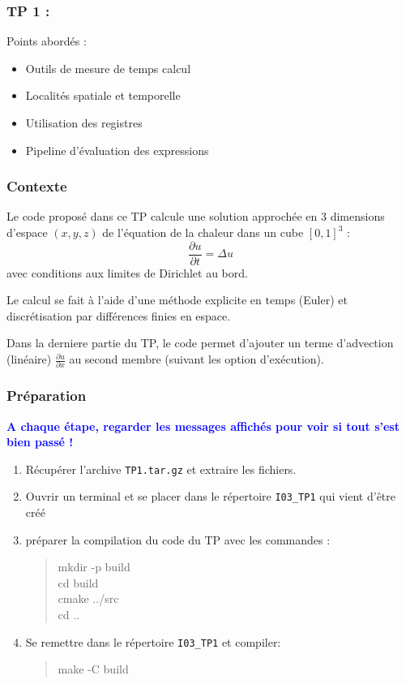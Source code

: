 \documentclass{beamer}
\begin{document}
\begin{frame}
	\frametitle{TP 1 :}
	\vfill
	\Large
	Points abord\'es :
	\vfill
	\begin{itemize}
		\item Outils de mesure de temps calcul
		\bigskip
		\item Localit\'es spatiale et temporelle
		\bigskip
		\item Utilisation des registres
		\bigskip
		\item Pipeline d'\'evaluation des expressions
	\end{itemize}
	\vfill
\end{frame}

\begin{frame}
\frametitle{Contexte}
	
	Le code propos\'e dans ce TP calcule une solution approch\'ee en 3 dimensions d'espace $(x,y,z)$ de l'\'equation de la chaleur dans un cube $[0,1]^3$ :
	$$
	\frac{\partial u}{\partial t} = \Delta u
	$$
	avec conditions aux limites de Dirichlet au bord.
	\vfill
	
	Le calcul se fait \`a l'aide d'une m\'ethode explicite en temps (Euler) et discr\'etisation par diff\'erences finies en espace.
	
	\vfill
	Dans la derniere partie du TP, le code permet d'ajouter un terme d'advection (linéaire) $\frac{\displaystyle\partial u}{\displaystyle\partial x}$ au second membre (suivant les option d'ex\'ecution).
	
	\vfill
	
\end{frame}

\begin{frame}
\frametitle{Pr\'eparation}
	
	\vfill
	\textcolor{blue}{\bf A chaque \'etape, regarder les messages affich\'es pour voir si tout s'est bien pass\'e !}
	\vfill

	\begin{enumerate}
		\item R\'ecup\'erer l'archive {\tt TP1.tar.gz} et extraire les fichiers.
		\item Ouvrir un terminal et se placer dans le r\'epertoire {\tt I03\_TP1} \break qui vient d'\^etre cr\'e\'e
		\item préparer la compilation du code du TP avec les commandes :
		\begin{quote}
			mkdir -p build\\
			cd build\\
			cmake ../src\\
			cd ..
		\end{quote}
		\item Se remettre dans le r\'epertoire {\tt I03\_TP1} et compiler:
		\begin{quote}
			make -C build
		\end{quote}
	\end{enumerate}
	\vfill
	
\end{frame}
\end{document}
